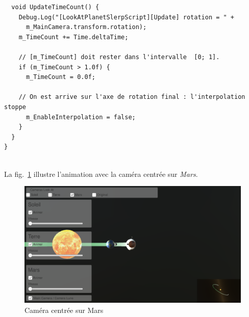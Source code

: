 \documentclass[a4paper,10pt]{article}
\newenvironment{solution}%
{\begin{tcolorbox}[breakable,colback=red!5!white,colframe=red!75!black,title=Solution]}%
{\end{tcolorbox}}
\begin{document}
\begin{solution}
\begin{lstlisting}
  void UpdateTimeCount() {
    Debug.Log("[LookAtPlanetSlerpScript][Update] rotation = " + 
      m_MainCamera.transform.rotation);
    m_TimeCount += Time.deltaTime;
		
    // [m_TimeCount] doit rester dans l'intervalle  [0; 1].
    if (m_TimeCount > 1.0f) {
      m_TimeCount = 0.0f;
			
    // On est arrive sur l'axe de rotation final : l'interpolation stoppe
      m_EnableInterpolation = false;
    }
  }
}
	
\end{lstlisting}

La fig.~\ref{fig:cam-mars} illustre l'animation avec la caméra centrée sur \textit{Mars}.

\end{solution}
\begin{figure}[!h]
	\begin{center}
		\includegraphics[scale=.50]{fig/camera-centree-Mars}
		\caption{Caméra centrée sur Mars}
		\label{fig:cam-mars}
	\end{center}
\end{figure}

\fi 
\end{document}
